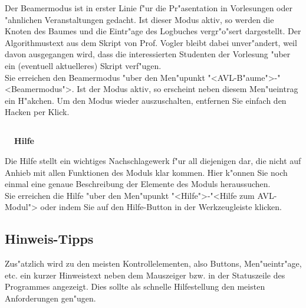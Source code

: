 
Der Beamermodus ist in erster Linie f"ur die Pr"asentation in Vorlesungen oder "ahnlichen Veranstaltungen gedacht. 
Ist dieser Modus aktiv, so werden die Knoten des Baumes und die Eintr"age des Logbuches vergr"o"sert dargestellt. Der Algorithmustext aus
dem Skript von Prof. Vogler bleibt dabei unver"andert, weil davon ausgegangen wird, dass die interessierten Studenten der 
Vorlesung "uber ein (eventuell aktuelleres) Skript verf"ugen. \\
Sie erreichen den Beamermodus "uber den Men"upunkt {\sc "<AVL-B"aume">-"<Beamermodus">}. Ist der Modus aktiv, so erscheint
neben diesem Men"ueintrag ein H"akchen. Um den Modus wieder auszuschalten, entfernen Sie einfach den Hacken per Klick.

\bigskip



\subsection[Hilfe]{}
\vspace{-4.3ex} {\bf {\large  \qquad \quad \ \ Hilfe}} 


Die Hilfe stellt ein wichtiges Nachschlagewerk f"ur all diejenigen dar, die nicht auf Anhieb mit allen Funktionen des 
Moduls klar kommen. Hier k"onnen Sie noch einmal eine genaue Beschreibung der Elemente des Moduls heraussuchen. \\
Sie erreichen die Hilfe "uber den Men"upunkt {\sc "<Hilfe">-"<Hilfe zum AVL-Modul">} oder indem Sie auf den Hilfe-Button
in der Werkzeugleiste klicken.

\medskip
\subsection{Hinweis-Tipps}
Zus"atzlich wird zu den meisten Kontrollelementen, also Buttons, Men"ueintr"age, etc. 
ein kurzer Hinweistext neben dem Mauszeiger bzw. in der Statuszeile des Programmes angezeigt. 
Dies sollte als schnelle Hilfestellung den meisten Anforderungen gen"ugen.
